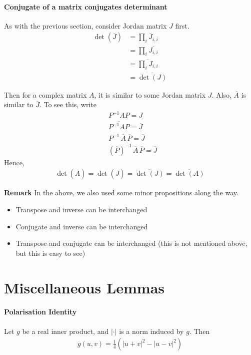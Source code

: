 \documentclass{article}
\begin{document}
\paragraph{Conjugate of a matrix conjugates determinant}
As with the previous section, consider Jordan matrix $J$ first.
\begin{align*}
	\det(\overline{J})
	&=\prod_i\overline{J}_{i,i}\\
	&=\prod_i\overline{J_{i,i}}\\
	&=\overline{\prod_iJ_{i,i}}\\
	&=\overline{\det(J)}
\end{align*}

Then for a complex matrix $A$, it is similar to some Jordan matrix $J$. Also, $\overline{A}$ is similar to $\overline{J}$.
To see this, write
\begin{align*}
	&P^{-1}AP=J\\
	&\overline{P^{-1}AP}=\overline{J}\\
	&\overline{P^{-1}}\,\overline{A}\,\overline{P}=\overline{J}\\
	&(\overline{P})^{-1}\, \overline{A}\, \overline{P}=\overline{J}
\end{align*}
Hence,
\begin{align*}
	\det(\overline{A}) = \det(\overline{J}) = \overline{\det(J)} = \overline{\det(A)}
\end{align*}

\textbf{Remark} In the above, we also used some minor propositions along the way. 
\begin{itemize}
	\item Transpose and inverse can be interchanged
	\item Conjugate and inverse can be interchanged
	\item Transpose and conjugate can be interchanged (this is not mentioned above, but this is easy to see)
\end{itemize}

\section{Miscellaneous Lemmas}

\paragraph{Polarisation Identity} Let $g$ be a real inner product, and $|\cdot|$ is a norm induced by $g$. Then 
\begin{align*}
	g(u,v) = \frac{1}{4}(|u+v|^2-|u-v|^2)
\end{align*}
\end{document}
